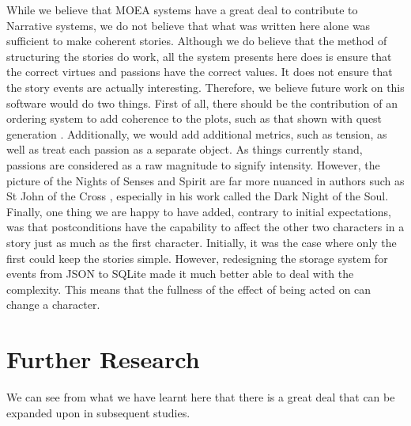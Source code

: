 \documentclass[11pt]{article}
\begin{document}
While we believe that MOEA systems have a great deal to contribute to Narrative systems, we do not believe that what was written here alone was sufficient to make coherent stories. Although we do believe that the method of structuring the stories do work, all the system presents here does is ensure that the correct virtues and passions have the correct values. It does not ensure that the story events are actually interesting. Therefore, we believe future work on this software would do two things. First of all, there should be the contribution of an ordering system to add coherence to the plots, such as that shown with quest generation \cite{questgeneration}. Additionally, we would add additional metrics, such as tension, as well as treat each passion as a separate object. As things currently stand, passions are considered as a raw magnitude to signify intensity. However, the picture of the Nights of Senses and Spirit are far more nuanced in authors such as St John of the Cross \cite{OperaOmniaStJohnOfTheCross}, especially in his work called the Dark Night of the Soul.\\

Finally, one thing we are happy to have added, contrary to initial expectations, was that postconditions have the capability to affect the other two characters in a story just as much as the first character. Initially, it was the case where only the first could keep the stories simple. However, redesigning the storage system for events from JSON to SQLite made it much better able to deal with the complexity. This means that the fullness of the effect of being acted on can change a character.\\

\section{Further Research}
We can see from what we have learnt here that there is a great deal that can be expanded upon in subsequent studies. 
\end{document}
